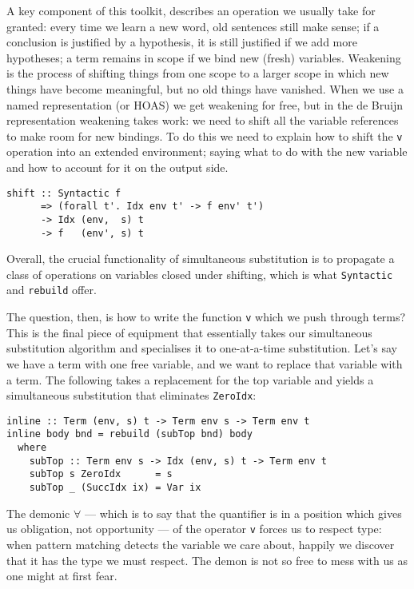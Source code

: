 A key component of this toolkit,  describes an operation we
usually take for granted: every time we learn a new word, old sentences still
make sense; if a conclusion is justified by a hypothesis, it is still justified
if we add more hypotheses; a term remains in scope if we bind new (fresh)
variables. Weakening is the process of shifting things from one scope to a
larger scope in which new things have become meaningful, but no old things have
vanished. When we use a named representation (or HOAS) we get weakening
for free, but in the de Bruijn representation weakening takes
work: we need to shift all the variable references to make room for new
bindings. To do this we need to explain how to shift the \texttt{v} operation
into an extended environment; saying what to do with the new variable and how to
account for it on the output side.
%
\begin{lstlisting}[style=haskell]
shift :: Syntactic f
      => (forall t'. Idx env t' -> f env' t')
      -> Idx (env,  s) t
      -> f   (env', s) t
\end{lstlisting}
%
Overall, the crucial functionality of simultaneous substitution is to propagate
a class of operations on variables closed under shifting, which is what
\texttt{Syntactic} and \texttt{rebuild} offer.

The question, then, is how to write the function \texttt{v} which we push
through terms? This is the final piece of equipment that essentially takes our
simultaneous substitution algorithm and specialises it to one-at-a-time
substitution. Let's say we have a term with one free variable, and we want to
replace that variable with a term. The following takes a replacement for the top
variable and yields a simultaneous substitution that eliminates
\texttt{ZeroIdx}:
%
\begin{lstlisting}[style=haskell,caption={A simultaneous substitution to inline terms}]
inline :: Term (env, s) t -> Term env s -> Term env t
inline body bnd = rebuild (subTop bnd) body
  where
    subTop :: Term env s -> Idx (env, s) t -> Term env t
    subTop s ZeroIdx      = s
    subTop _ (SuccIdx ix) = Var ix
\end{lstlisting}
%
The demonic $\forall$ --- which is to say that the quantifier is in a position
which gives us obligation, not opportunity --- of the operator \texttt{v} forces
us to respect type: when pattern matching detects the variable we care about,
happily we discover that it has the type we must respect. The demon is not so
free to mess with us as one might at first fear.


